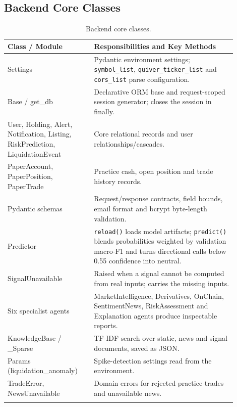 \subsection{Backend Core Classes}
{\renewcommand{\arraystretch}{1.3}
\begin{longtable}{|p{0.34\linewidth}|p{0.56\linewidth}|}
\hline\textbf{Class / Module} & \textbf{Responsibilities and Key Methods}\\\hline\endhead
Settings & Pydantic environment settings; \texttt{symbol\_list}, \texttt{quiver\_ticker\_list} and \texttt{cors\_list} parse configuration.\\\hline
Base / get\_db & Declarative ORM base and request-scoped session generator; closes the session in finally.\\\hline
User, Holding, Alert, Notification, Listing, RiskPrediction, LiquidationEvent & Core relational records and user relationships/cascades.\\\hline
PaperAccount, PaperPosition, PaperTrade & Practice cash, open position and trade history records.\\\hline
Pydantic schemas & Request/response contracts, field bounds, email format and bcrypt byte-length validation.\\\hline
Predictor & \texttt{reload()} loads model artifacts; \texttt{predict()} blends probabilities weighted by validation macro-F1 and turns directional calls below 0.55 confidence into neutral.\\\hline
SignalUnavailable & Raised when a signal cannot be computed from real inputs; carries the missing inputs.\\\hline
Six specialist agents & MarketIntelligence, Derivatives, OnChain, SentimentNews, RiskAssessment and Explanation agents produce inspectable reports.\\\hline
KnowledgeBase / \_Sparse & TF-IDF search over static, news and signal documents, saved as JSON.\\\hline
Params (liquidation\_anomaly) & Spike-detection settings read from the environment.\\\hline
TradeError, NewsUnavailable & Domain errors for rejected practice trades and unavailable news.\\\hline
\caption{Backend core classes.}\label{tab:coreclasses}
\end{longtable}}

